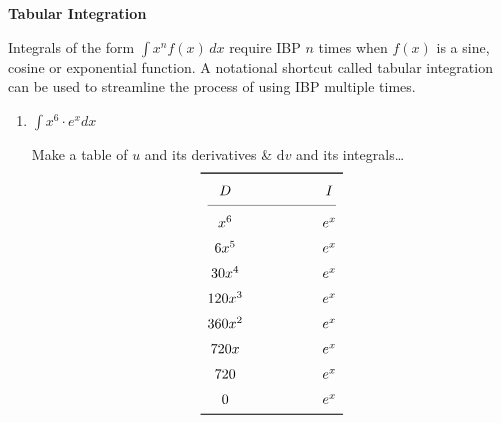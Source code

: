 \documentclass{ximera}
\newcommand{\tikzmark}[1]{%
    \tikz[overlay, remember picture, baseline] \node (#1) {};%
}
\begin{document}
\begin{center}
\textbf{Tabular Integration}
\end{center}

Integrals of the form $\int x^n f(x) \,dx$ require IBP $n$ times when $f(x)$ is a sine, cosine or exponential function.
A notational shortcut called tabular integration can be used to streamline the process of using IBP multiple times.




\begin{enumerate}
    \item $\displaystyle{\int x^6\cdot e^x dx}$

    Make a table of $u$ and its derivatives \& $\mathrm{d}v$ and its integrals\dots
   \[\renewcommand{\arraystretch}{1.5}
    \begin{array}{c @{\hspace*{2.0cm}} c}\toprule
       D & I \\\cmidrule(lr){1-2}
       x^6  \tikzmark{Left 1} & \tikzmark{Right 1} e^x \\
      6x^5  \tikzmark{Left 2} & \tikzmark{Right 2} e^x \\
      30x^4 \tikzmark{Left 3} & \tikzmark{Right 3} e^x \\
     120x^3 \tikzmark{Left 4} & \tikzmark{Right 4} e^x \\
     360x^2 \tikzmark{Left 5} & \tikzmark{Right 5} e^x \\
     720x   \tikzmark{Left 6} & \tikzmark{Right 6} e^x \\
     720    \tikzmark{Left 7} & \tikzmark{Right 7} e^x \\
       0    \tikzmark{Left 8} & \tikzmark{Right 8} e^x \\\bottomrule
    \end{array}%
    \]
\end{enumerate}



\begin{center}
\begin{foldable}
\end{foldable}
\end{center}
\end{document}
